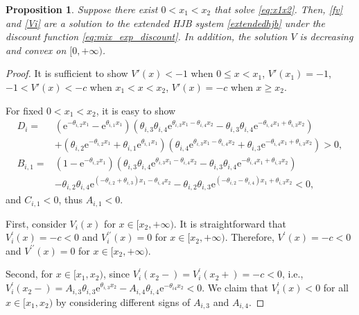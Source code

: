\documentclass[11pt,reqno]{article}%
\newtheorem{proposition}[theorem]{Proposition}
\numberwithin{equation}{section}
\begin{document}
\begin{proposition}\label{convex1}
Suppose there exist  $0 < x_1 < x_2$ that solve \eqref{eq:x1x2}. Then, \eqref{fv} and \eqref{Vi} are a solution to the extended HJB system \eqref{extendedhjb} under the discount function \eqref{eq:mix_exp_discount}. In addition, the solution $V$ is decreasing and convex on $[0,+\infty)$.
\end{proposition}
\begin{proof}
It is sufficient to show $V'(x) < -1$ when $0\le x < x_1$, $V'(x_1)=-1$, $-1 < V'(x) < -c$ when $x_1 < x < x_2$, $V'(x) =-c$ when $x\ge x_2$. 

For fixed $0 < x_1 < x_2$, it is easy to show 
\begin{equation}\nonumber\begin{aligned}
D_{i}=&\left(\mathrm{e}^{-\theta_{i,2} x_1}-\mathrm{e}^{\theta_{i,1} x_1}\right)\left(\theta_{i,3}\theta_{i,4} \mathrm{e}^{\theta_{i,3} x_1 - \theta_{i,4} x_2} - \theta_{i,3}\theta_{i,4} \mathrm{e}^{-\theta_{i,4} x_1 + \theta_{i,3} x_2}\right)\\&+
\left(\theta_{i,2}\mathrm{e}^{-\theta_{i,2} x_1}+\theta_{i,1}\mathrm{e}^{\theta_{i,1} x_1}\right)\left(\theta_{i,4} \mathrm{e}^{\theta_{i,3} x_1 - \theta_{i,4} x_2} + \theta_{i,3} \mathrm{e}^{-\theta_{i,4} x_1 + \theta_{i,3} x_2}\right)>0,\\
B_{i,1}=&\left(1-\mathrm{e}^{-\theta_{i,2} x_1}\right)\left(\theta_{i,3}\theta_{i,4} \mathrm{e}^{\theta_{i,3} x_1 - \theta_{i,4} x_2} - \theta_{i,3}\theta_{i,4} \mathrm{e}^{-\theta_{i,4} x_1 + \theta_{i,3} x_2}\right)\\&-\theta_{i,2}\theta_{i,4} \mathrm{e}^{(-\theta_{i,2} + \theta_{i,3}) x_1- \theta_{i,4} x_2} - \theta_{i,2}\theta_{i,3}  \mathrm{e}^{(-\theta_{i,2} - \theta_{i,4}) x_1 + \theta_{i,3} x_2} < 0,\end{aligned}\end{equation}
and $C_{i,1} < 0$,  thus $A_{i,1} < 0$. 

First, consider $V_i(x)$ for $x \in [x_2, +\infty)$. It is straightforward that $V^\prime_i(x) = -c < 0$ and $V^{\prime\prime}_i(x) =0$ for $x \in [x_2, +\infty)$. Therefore, $V^\prime(x) = -c < 0$ and $V^{\prime\prime}(x) =0$ for $x \in [x_2, +\infty)$. 

Second, for $x \in [x_1, x_2)$, since $V^\prime_i(x_2-) = V^\prime_i(x_2+)=-c < 0$, i.e., $V^\prime_i(x_2-)=A_{i,3} \theta_{i,3} \mathrm{e}^{\theta_{i,3} x_2} - A_{i,4} \theta_{i,4} \mathrm{e}^{-\theta_{i4} x_2} < 0$. We claim that $V^\prime_i(x) < 0$ for all $x \in [x_1, x_2)$ by considering different signs of $A_{i,3}$ and $A_{i,4}$.  


\end{proof}
\end{document}
